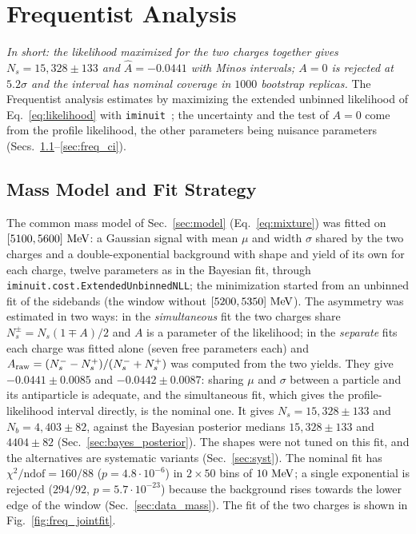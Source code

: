 \section{Frequentist Analysis}
\label{sec:frequentist}
\label{app:freq}
\emph{In short: the likelihood maximized for the two charges together gives $N_s=15{,}328\pm133$ and $\hat A=-0.0441$ with Minos intervals; $A=0$ is rejected at $5.2\sigma$ and the interval has nominal coverage in $1000$ bootstrap replicas.}
The Frequentist analysis estimates \Araw by maximizing the extended unbinned likelihood of Eq.~\eqref{eq:likelihood} with \texttt{iminuit}~\cite{iminuit}; the uncertainty and the test of $A=0$ come from the profile likelihood, the other parameters being nuisance parameters (Secs.~\ref{sec:freq_model}--\ref{sec:freq_ci}).

\subsection{Mass Model and Fit Strategy}
\label{sec:freq_model}
\label{sec:freq_simfit}
The common mass model of Sec.~\ref{sec:model} (Eq.~\eqref{eq:mixture}) was fitted on $[5100,5600]\,\,\text{Me\hspace{-.08em}V}$: a Gaussian signal with mean $\mu$ and width $\sigma$ shared by the two charges and a double-exponential background with shape and yield of its own for each charge, twelve parameters as in the Bayesian fit, through \texttt{iminuit.cost.ExtendedUnbinnedNLL}; the minimization started from an unbinned fit of the sidebands (the window without $[5200,5350]\,\,\text{Me\hspace{-.08em}V}$). The asymmetry was estimated in two ways: in the \emph{simultaneous} fit the two charges share $N_s^\pm=N_s(1\mp A)/2$ and $A$ is a parameter of the likelihood; in the \emph{separate} fits each charge was fitted alone (seven free parameters each) and $A_{\mathrm{raw}}=(N_s^--N_s^+)/(N_s^-+N_s^+)$ was computed from the two yields. They give $-0.0441\pm0.0085$ and $-0.0442\pm0.0087$: sharing $\mu$ and $\sigma$ between a particle and its antiparticle is adequate, and the simultaneous fit, which gives the profile-likelihood interval directly, is the nominal one. It gives $N_s=15{,}328\pm133$ and $N_b=4{,}403\pm82$, against the Bayesian posterior medians $15{,}328\pm133$ and $4404\pm82$ (Sec.~\ref{sec:bayes_posterior}). The shapes were not tuned on this fit, and the alternatives are systematic variants (Sec.~\ref{sec:syst}). The nominal fit has $\chi^2/\mathrm{ndof}=160/88$ ($p=4.8\cdot 10^{-6}$) in $2\times50$ bins of $10\,\,\text{Me\hspace{-.08em}V}$; a single exponential is rejected ($294/92$, $p=5.7\cdot 10^{-23}$) because the background rises towards the lower edge of the window (Sec.~\ref{sec:data_mass}). The fit of the two charges is shown in Fig.~\ref{fig:freq_jointfit}.

